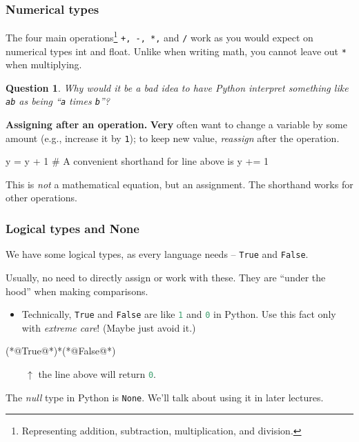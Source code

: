 \documentclass{beamer}
\newenvironment{codeblock}
    {\hfill\begin{beamerboxesrounded}[lower=codecol, width=0.8\textwidth]
    \medskip

    }
    { 
    \end{beamerboxesrounded}\hfill
    }
\theoremstyle{example}
\newtheorem{question}{Question}
\newcommand{\ct}[1]{\lstinline[language=Python]!#1!}
\newcommand{\ttt}[1]{{\small\texttt{#1}}}
\begin{document}
\begin{frame}[fragile]
\frametitle{Numerical types}

The four main operations\footnote{Representing addition, subtraction, multiplication, and division.} \ttt{+, -, *,} and \ttt{/} work as you would expect on numerical types {\ttb int} and {\ttb float}. Unlike when writing math, you cannot leave out \ttt{*} when multiplying.

\pause
\begin{question} Why would it be a \emph{bad} idea to have Python interpret something like \ttt{ab} as being ``\ttt{a} times \ttt{b}''?
\end{question}

\pause

{\bf \color{mygreen} Assigning after an operation.} {\bf Very} often want to change a variable by some amount (e.g., increase it by \ttt{1}); to keep new value, \emph{reassign} after the operation.

\begin{codeblock}

\begin{python}
y = y + 1
# A convenient shorthand for line above is
y += 1
\end{python}

\end{codeblock}

\pause
This is \emph{not} a mathematical equation, but an assignment. The shorthand works for other operations.
\end{frame}

\begin{frame}[fragile]
\frametitle{Logical types and {\ttm None}}

We have some logical types, as every language needs {--} \ttt{True} and \ttt{False}. 

Usually, no need to directly assign or work with these. They are ``under the hood'' when making comparisons. 
\pause
\begin{itemize}
	\item Technically, \ttt{True} and \ttt{False} are like \ct{1} and \ct{0} in Python. Use this fact only with \emph{extreme care}! (Maybe just avoid it.)
\end{itemize}
\begin{codeblock}

\begin{python}[numbers=none]
(*@\color{numeric}True@*)*(*@\color{numeric}False@*)
\end{python}

\end{codeblock}

$\qquad \uparrow$ the line above will return \ct{0}.
\vspace*{12pt}

\pause
The \emph{null} type in Python is \ttt{None}. We'll talk about using it in later lectures.
\end{frame}
\end{document}
